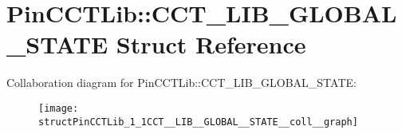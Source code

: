 \hypertarget{structPinCCTLib_1_1CCT__LIB__GLOBAL__STATE}{\section{Pin\-C\-C\-T\-Lib\-:\-:C\-C\-T\-\_\-\-L\-I\-B\-\_\-\-G\-L\-O\-B\-A\-L\-\_\-\-S\-T\-A\-T\-E Struct Reference}
\label{structPinCCTLib_1_1CCT__LIB__GLOBAL__STATE}
}


Collaboration diagram for Pin\-C\-C\-T\-Lib\-:\-:C\-C\-T\-\_\-\-L\-I\-B\-\_\-\-G\-L\-O\-B\-A\-L\-\_\-\-S\-T\-A\-T\-E\-:
\nopagebreak
\begin{figure}[H]
\begin{center}
\leavevmode
\texttt{[image: structPinCCTLib\_1\_1CCT\_\_LIB\_\_GLOBAL\_\_STATE\_\_coll\_\_graph]}
\end{center}
\end{figure}
